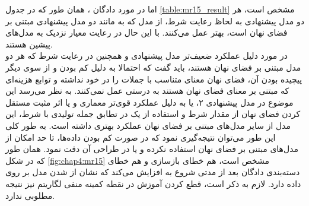 اما در مورد دادگان \sst{}، همان طور که در جدول \ref{table:mr15_result} مشخص است، هر دو مدل پیشنهادی به لحاظ رعایت شرط، از مدل \towardctg{} که به مانند دو مدل پیشنهادی مبتنی بر فضای نهان است، بهتر عمل می‌کنند. با این حال در رعایت معیار \jaccard{} نزدیک به مدل‌های پیشین هستند.
\\
در مورد دلیل عملکرد ضعیف‌تر مدل پیشنهادی و همچنین \towardctg{} در رعایت شرط که هر دو مدل مبتنی بر فضای نهان هستند، باید گفت که احتمالا به دلیل کم بودن و از سوی دیگر پیچیده بودن آن، فضای نهان معنای متناسب با جملات را در خود نداشته و توابع هزینه‌ای که مبتنی بر معنای فضای نهان هستند به درستی عمل نمی‌کنند. به نظر می‌رسد این موضوع در مدل پیشنهادی ۲، یا به دلیل عملکرد قوی‌تر معماری \transformer{} و یا اثر مثبت مستقل کردن فضای نهان از مقدار شرط و استفاده از یک \classifier{} در تطابق جمله تولیدی با شرط، این مدل از سایر مدل‌های مبتنی بر فضای نهان عملکرد بهتری داشته است. به طور کلی این طور می‌توان نتیجه‌گیری نمود که در صورت کم بودن داده‌ها، تا حد امکان از مدل‌های مبتنی بر فضای نهان استفاده نکرده و یا در طراحی آن دقت نمود. همان طور که در شکل \ref{fig:chap4:mr15} مشخص است، هم خطای بازسازی و هم خطای دسته‌بندی دادگان \validation{} بعد از مدتی شروع به افزایش می‌کند که نشان از
شدن مدل بر روی داده دارد. لازم به ذکر است، قطع کردن آموزش در نقطه کمینه منفی لگاریتم \likelihood{} نیز نتیجه مطلوبی ندارد.
